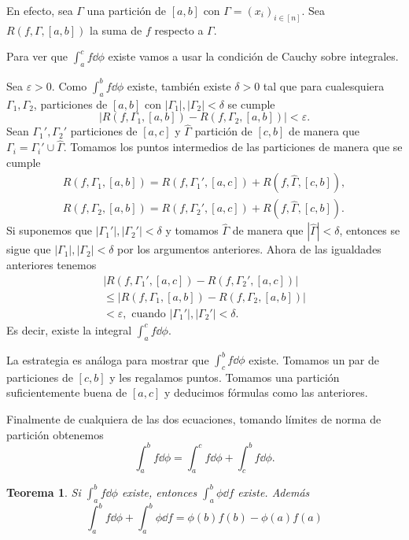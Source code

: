 \documentclass[12pt]{article}
\theoremstyle{plain}
\newtheorem{Th}{Teorema}[subsection]   %
\theoremstyle{definition}
\theoremstyle{remark}
\numberwithin{equation}{section}
\renewcommand{\leq}{\leqslant}      %
\renewcommand{\:}{\colon}           %
\newcommand{\bonj}[1]{\left\lbrack#1\right\rbrack}
\begin{document}
\begin{multicols}{2}
\begin{ptcb}
En efecto, sea $\Gamma$ una partición de $\bonj{a,b}$ con $\Gamma=(x_i)_{i\in\bonj{n}}$. Sea $R(f,\Gamma,\bonj{a,b})$ la suma de $f$ respecto a $\Gamma$. \par
Para ver que $\int_{a}^{c}f\dd\phi$ existe vamos a usar la condición de Cauchy sobre integrales. \par
Sea $\varepsilon>0$. Como $\int_{a}^{b}f\dd\phi$ existe, también existe $\delta>0$ tal que para cualesquiera $\Gamma_1,\Gamma_2$, particiones de $\bonj{a,b}$ con $|\Gamma_1|,|\Gamma_2|<\delta$ se cumple
$$|R(f,\Gamma_1,\bonj{a,b})-R(f,\Gamma_2,\bonj{a,b})|<\varepsilon.$$
Sean $\Gamma_1',\Gamma_2'$ particiones de $\bonj{a,c}$ y $\hat{\Gamma}$ partición de $\bonj{c,b}$ de manera que $\Gamma_i=\Gamma_i'\cup\hat{\Gamma}$. Tomamos los puntos intermedios de las particiones de manera que se cumple
\begin{gather*}
  R(f,\Gamma_1,\bonj{a,b})=R(f,\Gamma_1',\bonj{a,c})+R(f,\hat{\Gamma},\bonj{c,b}),\\
  R(f,\Gamma_2,\bonj{a,b})=R(f,\Gamma_2',\bonj{a,c})+R(f,\hat{\Gamma},\bonj{c,b}).
\end{gather*}
Si suponemos que $|\Gamma_1'|,|\Gamma_2'|<\delta$ y tomamos $\hat{\Gamma}$ de manera que $|\hat{\Gamma}|<\delta$, entonces se sigue que $|\Gamma_1|,|\Gamma_2|<\delta$ por los argumentos anteriores. Ahora de las igualdades anteriores tenemos
\begin{gather*}
  |R(f,\Gamma_1',\bonj{a,c})-R(f,\Gamma_2',\bonj{a,c})| \\
  \leq |R(f,\Gamma_1,\bonj{a,b})-R(f,\Gamma_2,\bonj{a,b})|\\
  <\varepsilon,\text{ cuando }|\Gamma_1'|,|\Gamma_2'|<\delta.
\end{gather*}
Es decir, existe la integral $\int_{a}^{c}f\dd\phi$. \par
La estrategia es análoga para mostrar que $\int_{c}^{b}f\dd\phi$ existe. Tomamos un par de particiones de $\bonj{c,b}$ y les regalamos puntos. Tomamos una partición suficientemente buena de $\bonj{a,c}$ y deducimos fórmulas como las anteriores.\par
Finalmente de cualquiera de las dos ecuaciones, tomando límites de norma de partición obtenemos
 $$\int_{a}^{b}f\dd\phi=\int_{a}^{c}f\dd\phi+\int_{c}^{b}f\dd\phi.$$
\end{ptcb}
\begin{Th}\label{thm:intPartesRS}
  Si $\int_{a}^{b}f\dd\phi$ existe, entonces $\int_{a}^{b}\phi\dd f$ existe. Además
  $$\int_{a}^{b}f\dd\phi+\int_{a}^{b}\phi\dd f=\phi(b)f(b)-\phi(a)f(a)$$

\end{Th}
\end{multicols}
\end{document}
